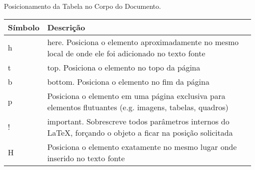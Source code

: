 \begin{quadro}[H]
    \centering
    \caption{Posicionamento da Tabela no Corpo do Documento.\label{qua:quadro-floats}}
    \begin{tabular}{|p{4cm}|p{10cm}|}
        \hline
        \textbf{Símbolo} & \textbf{Descrição} \\
        \hline
        h & here. Posiciona o elemento aproximadamente no mesmo local de onde ele foi adicionado no texto fonte \\
        \hline
        t & top. Posiciona o elemento no topo da página \\
        \hline
        b & bottom. Posiciona o elemento no fim da página \\
        \hline
        p &	Posiciona o elemento em uma página exclusiva para elementos flutuantes (e.g. imagens, tabelas, quadros) \\
        \hline
        ! & important. Sobrescreve todos parâmetros internos do LaTeX, forçando o objeto a ficar na posição solicitada \\
        \hline
        H & Posiciona o elemento exatamente no mesmo lugar onde inserido no texto fonte \\
        \hline
    \end{tabular}
\end{quadro}